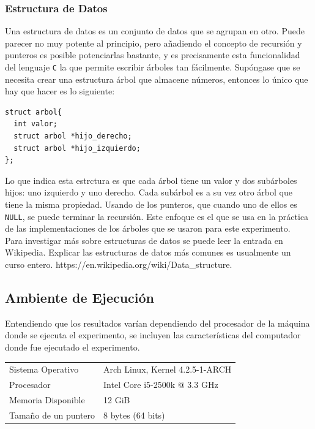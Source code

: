 \documentclass[12pt,letterpaper]{report}
\begin{document}
\subsubsection{Estructura de Datos}
Una estructura de datos es un conjunto de datos que se agrupan en otro. Puede parecer no muy potente al principio, pero añadiendo el concepto de recursión y punteros es posible potenciarlas bastante, y es precisamente esta funcionalidad del lenguaje \texttt{C} la que permite escribir árboles tan fácilmente. Supóngase que se necesita crear una estructura árbol que almacene números, entonces lo único que hay que hacer es lo siguiente:
\begin{verbatim}
struct arbol{
  int valor;
  struct arbol *hijo_derecho;
  struct arbol *hijo_izquierdo;
};
\end{verbatim}
Lo que indica esta estrctura es que cada árbol tiene un valor y dos subárboles hijos: uno izquierdo y uno derecho. Cada subárbol es a su vez otro árbol que tiene la misma propiedad. Usando de los punteros, que cuando uno de ellos es \texttt{NULL}, se puede terminar la recursión. Este enfoque es el que se usa en la práctica de las implementaciones de los árboles que se usaron para este experimento.\\

Para investigar más sobre estructuras de datos se puede leer la entrada en Wikipedia. Explicar las estructuras de datos más comunes es usualmente un curso entero. https://en.wikipedia.org/wiki/Data\_structure.

\subsection{Ambiente de Ejecución}
\label{subsec:ambiente}

Entendiendo que los resultados varían dependiendo del procesador de la máquina donde se ejecuta el experimento, se incluyen las características del computador donde fue ejecutado el experimento.\\

\begin{tabular}{ll}
  Sistema Operativo & Arch Linux, Kernel 4.2.5-1-ARCH\\
  Procesador & Intel Core i5-2500k @ 3.3 GHz\\
  Memoria Disponible & 12 GiB\\
  Tamaño de un puntero & 8 bytes (64 bits)\\
\end{tabular}
\end{document}
